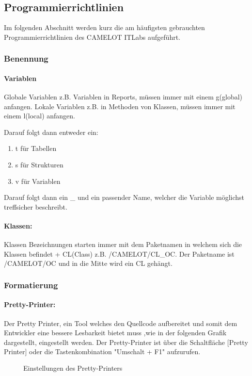 \subsection{Programmierrichtlinien}
\label{app:Programmierrichtlinien}
Im folgenden Abschnitt werden kurz die am häufigsten gebrauchten Programmierrichtlinien des CAMELOT ITLabs aufgeführt.

\subsubsection{Benennung}
\label{Benennung}
\paragraph{Variablen}
Globale Variablen z.B. Variablen in Reports, müssen immer mit einem g(global) anfangen. 
Lokale Variablen z.B. in Methoden von Klassen, müssen immer mit einem l(local) anfangen.

Darauf folgt dann entweder ein:
\begin{enumerate}
	\item t für Tabellen
	\item s für Strukturen
	\item v für Variablen
\end{enumerate}
	
Darauf folgt dann ein \_ und ein passender Name, welcher die Variable möglichst treffsicher beschreibt.

\paragraph{Klassen:}
Klassen Bezeichnungen starten immer mit dem Paketnamen in welchem sich die Klassen befindet + CL(Class) z.B. /CAMELOT/CL\_OC. Der Paketname ist /CAMELOT/OC und in die Mitte wird ein CL gehängt.

\subsubsection{Formatierung}
\label{Formatierung}
\paragraph{Pretty-Printer:}
Der Pretty Printer, ein Tool welches den Quellcode aufbereitet und somit dem Entwickler eine bessere Lesbarkeit bietet muss ,wie in der folgenden Grafik dargestellt, eingestellt werden. Der Pretty-Printer ist über die Schaltfläche [Pretty Printer] oder die Tastenkombination "Umschalt + F1" aufzurufen.
\begin{figure}[htb]
	\centering
	\caption{Einstellungen des Pretty-Printers}
\end{figure}



	


